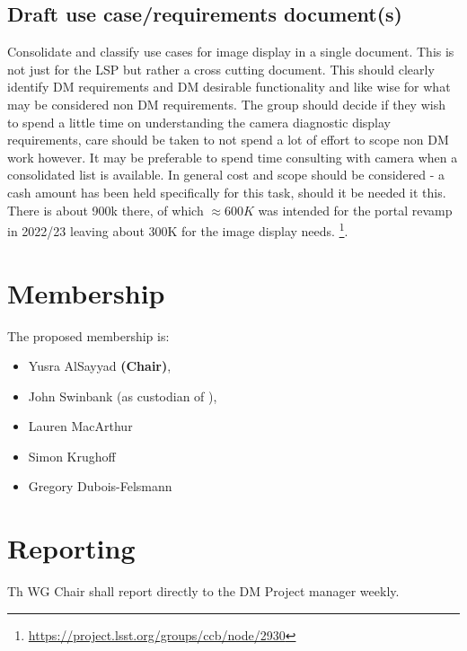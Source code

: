 \subsection{Draft use case/requirements document(s)}
Consolidate and classify use cases for image display in a single document. This is not just for the \gls{LSP} but rather a cross cutting document. This should clearly identify \gls{DM} requirements and \gls{DM} desirable functionality and like wise for what may be considered non \gls{DM} requirements.
The group should decide if they wish to spend a little time on understanding the camera diagnostic display requirements, care should be taken to not spend a lot of effort to scope non \gls{DM} work however. It may be preferable to spend time consulting with camera when a consolidated list is available.
In general cost and scope should be considered - a cash amount has been held specifically for this task, should it be needed it this. There is about 900k there, of which $\approx600K$ was intended for the portal revamp in 2022/23 leaving about 300K for the image display needs.  \footnote{\url{https://project.lsst.org/groups/ccb/node/2930}}.


\section{Membership}

The proposed membership is:

\begin{itemize}
  \item Yusra AlSayyad \textbf{(Chair)},
  \item John Swinbank (as custodian of ),
  \item Lauren MacArthur
  \item Simon Krughoff
  \item Gregory Dubois-Felsmann
\end{itemize}

\section{Reporting}

Th \gls{WG} Chair shall report directly to the \gls{DM} Project manager weekly.

